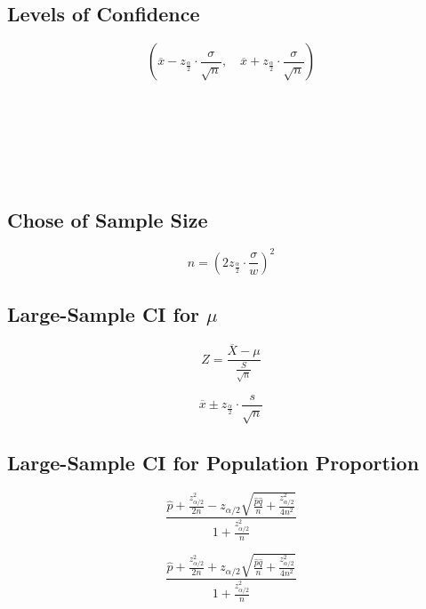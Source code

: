 \documentclass[UTF8]{ctexart}
\numberwithin{equation}{subsection}%
\begin{document}
	\subsection{Levels of Confidence}
	\begin{Large}
		\begin{equation}
		\left(\overline{x}-z_{\frac{\alpha}{2}}\cdot\frac{\sigma}{\sqrt{n}},\quad \overline{x}+z_{\frac{\alpha}{2}}\cdot\frac{\sigma}{\sqrt{n}}\right)
		\end{equation}		
	\end{Large}
~\\
~\\
~\\
~\\
~\\
	\subsection{Chose of Sample Size}
	\begin{Large}
	\begin{equation}
		n=\left(2z_{\frac{\alpha}{2}}\cdot\frac{\sigma}{w}\right)^2
	\end{equation}
	\end{Large}
	\subsection{Large-Sample CI for $\mu$}		
	\begin{Large}
		\begin{equation}
		Z=\frac{\overline{X}-\mu}{\frac{S}{\sqrt{n}}}
		\end{equation}
	\end{Large}
	\begin{Large}
		\begin{equation}
		\overline{x}\pm z_{\frac{\alpha}{2}}\cdot\frac{s}{\sqrt{n}}
		\end{equation}
	\end{Large}
	\subsection{Large-Sample CI for Population Proportion}
	\begin{LARGE}
		\begin{equation}
			\frac{\hat{p}+\frac{z^2_{\alpha/2}}{2n}-z_{\alpha/2}\sqrt{\frac{\hat{p}\hat{q}}{n}+\frac{z^2_{\alpha/2}}{4n^2}}}{1+\frac{z^2_{\alpha/2}}{n}} 
		\end{equation}
	\end{LARGE}
	\begin{LARGE}
		\begin{equation}
		 \frac{\hat{p}+\frac{z^2_{\alpha/2}}{2n}+z_{\alpha/2}\sqrt{\frac{\hat{p}\hat{q}}{n}+\frac{z^2_{\alpha/2}}{4n^2}}}{1+\frac{z^2_{\alpha/2}}{n}}
		\end{equation}
	\end{LARGE}
~\\
~\\
~\\
~\\
~\\
\end{document}
